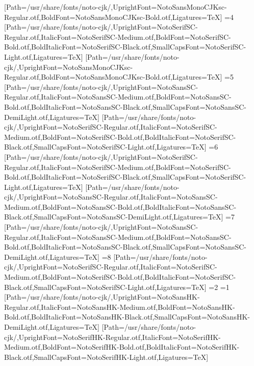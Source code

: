 [Path=/usr/share/fonts/noto-cjk/,UprightFont=NotoSansMonoCJKsc-Regular.otf,BoldFont=NotoSansMonoCJKsc-Bold.otf,Ligatures=TeX]
\else\ifnum\value{CJKFonts}=4
[Path=/usr/share/fonts/noto-cjk/,UprightFont=NotoSerifSC-Regular.otf,ItalicFont=NotoSerifSC-Medium.otf,BoldFont=NotoSerifSC-Bold.otf,BoldItalicFont=NotoSerifSC-Black.otf,SmallCapsFont=NotoSerifSC-Light.otf,Ligatures=TeX]
[Path=/usr/share/fonts/noto-cjk/,UprightFont=NotoSansMonoCJKsc-Regular.otf,BoldFont=NotoSansMonoCJKsc-Bold.otf,Ligatures=TeX]
\else\ifnum\value{CJKFonts}=5
[Path=/usr/share/fonts/noto-cjk/,UprightFont=NotoSansSC-Regular.otf,ItalicFont=NotoSansSC-Medium.otf,BoldFont=NotoSansSC-Bold.otf,BoldItalicFont=NotoSansSC-Black.otf,SmallCapsFont=NotoSansSC-DemiLight.otf,Ligatures=TeX]
[Path=/usr/share/fonts/noto-cjk/,UprightFont=NotoSerifSC-Regular.otf,ItalicFont=NotoSerifSC-Medium.otf,BoldFont=NotoSerifSC-Bold.otf,BoldItalicFont=NotoSerifSC-Black.otf,SmallCapsFont=NotoSerifSC-Light.otf,Ligatures=TeX]
\else\ifnum\value{CJKFonts}=6
[Path=/usr/share/fonts/noto-cjk/,UprightFont=NotoSerifSC-Regular.otf,ItalicFont=NotoSerifSC-Medium.otf,BoldFont=NotoSerifSC-Bold.otf,BoldItalicFont=NotoSerifSC-Black.otf,SmallCapsFont=NotoSerifSC-Light.otf,Ligatures=TeX]
[Path=/usr/share/fonts/noto-cjk/,UprightFont=NotoSansSC-Regular.otf,ItalicFont=NotoSansSC-Medium.otf,BoldFont=NotoSansSC-Bold.otf,BoldItalicFont=NotoSansSC-Black.otf,SmallCapsFont=NotoSansSC-DemiLight.otf,Ligatures=TeX]
\else\ifnum\value{CJKFonts}=7
[Path=/usr/share/fonts/noto-cjk/,UprightFont=NotoSansSC-Regular.otf,ItalicFont=NotoSansSC-Medium.otf,BoldFont=NotoSansSC-Bold.otf,BoldItalicFont=NotoSansSC-Black.otf,SmallCapsFont=NotoSansSC-DemiLight.otf,Ligatures=TeX]
\else\ifnum\value{CJKFonts}=8
[Path=/usr/share/fonts/noto-cjk/,UprightFont=NotoSerifSC-Regular.otf,ItalicFont=NotoSerifSC-Medium.otf,BoldFont=NotoSerifSC-Bold.otf,BoldItalicFont=NotoSerifSC-Black.otf,SmallCapsFont=NotoSerifSC-Light.otf,Ligatures=TeX]
\fi\fi\fi\fi\fi\fi\fi\fi\else
\ifnum\value{CJKLanguage}=2
\ifnum\value{CJKFonts}=1
[Path=/usr/share/fonts/noto-cjk/,UprightFont=NotoSansHK-Regular.otf,ItalicFont=NotoSansHK-Medium.otf,BoldFont=NotoSansHK-Bold.otf,BoldItalicFont=NotoSansHK-Black.otf,SmallCapsFont=NotoSansHK-DemiLight.otf,Ligatures=TeX]
[Path=/usr/share/fonts/noto-cjk/,UprightFont=NotoSerifHK-Regular.otf,ItalicFont=NotoSerifHK-Medium.otf,BoldFont=NotoSerifHK-Bold.otf,BoldItalicFont=NotoSerifHK-Black.otf,SmallCapsFont=NotoSerifHK-Light.otf,Ligatures=TeX]

